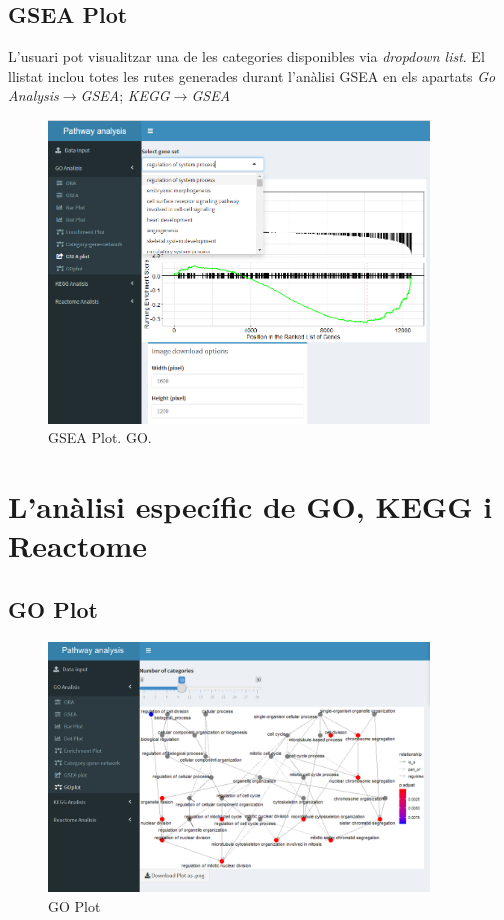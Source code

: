 \documentclass[]{article}
\begin{document}
\subsection{GSEA Plot}
L'usuari pot visualitzar una de les categories disponibles via \textit{dropdown list}. El llistat inclou totes les rutes generades durant l'anàlisi GSEA en els apartats \textit{Go Analysis}$\rightarrow$\textit{GSEA}; \textit{KEGG}$\rightarrow$\textit{GSEA}
\begin{figure}[H]
\centering
\includegraphics[width=0.9\textwidth]{App_F18_Items_GO_GSEA_Plot.png} 
\caption{GSEA Plot. GO.}
\end{figure}


\section{L'anàlisi específic de GO, KEGG i Reactome}

\label{sec:ASpec}


\subsection{GO Plot}

\begin{figure}[H]
\centering
\includegraphics[width=0.9\textwidth]{App_F19_Items_GO_GOPlot.png} 
\caption{GO Plot}
\end{figure}
\end{document}
